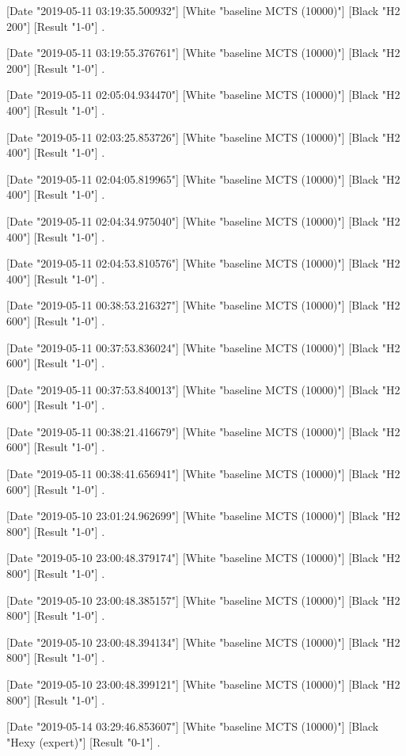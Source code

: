 {[Date "2019-05-11 03:19:35.500932"]
[White "baseline MCTS (10000)"]
[Black "H2 200"]
[Result "1-0"]
.

[Date "2019-05-11 03:19:55.376761"]
[White "baseline MCTS (10000)"]
[Black "H2 200"]
[Result "1-0"]
.

[Date "2019-05-11 02:05:04.934470"]
[White "baseline MCTS (10000)"]
[Black "H2 400"]
[Result "1-0"]
.

[Date "2019-05-11 02:03:25.853726"]
[White "baseline MCTS (10000)"]
[Black "H2 400"]
[Result "1-0"]
.

[Date "2019-05-11 02:04:05.819965"]
[White "baseline MCTS (10000)"]
[Black "H2 400"]
[Result "1-0"]
.

[Date "2019-05-11 02:04:34.975040"]
[White "baseline MCTS (10000)"]
[Black "H2 400"]
[Result "1-0"]
.

[Date "2019-05-11 02:04:53.810576"]
[White "baseline MCTS (10000)"]
[Black "H2 400"]
[Result "1-0"]
.

[Date "2019-05-11 00:38:53.216327"]
[White "baseline MCTS (10000)"]
[Black "H2 600"]
[Result "1-0"]
.

[Date "2019-05-11 00:37:53.836024"]
[White "baseline MCTS (10000)"]
[Black "H2 600"]
[Result "1-0"]
.

[Date "2019-05-11 00:37:53.840013"]
[White "baseline MCTS (10000)"]
[Black "H2 600"]
[Result "1-0"]
.

[Date "2019-05-11 00:38:21.416679"]
[White "baseline MCTS (10000)"]
[Black "H2 600"]
[Result "1-0"]
.

[Date "2019-05-11 00:38:41.656941"]
[White "baseline MCTS (10000)"]
[Black "H2 600"]
[Result "1-0"]
.

[Date "2019-05-10 23:01:24.962699"]
[White "baseline MCTS (10000)"]
[Black "H2 800"]
[Result "1-0"]
.

[Date "2019-05-10 23:00:48.379174"]
[White "baseline MCTS (10000)"]
[Black "H2 800"]
[Result "1-0"]
.

[Date "2019-05-10 23:00:48.385157"]
[White "baseline MCTS (10000)"]
[Black "H2 800"]
[Result "1-0"]
.

[Date "2019-05-10 23:00:48.394134"]
[White "baseline MCTS (10000)"]
[Black "H2 800"]
[Result "1-0"]
.

[Date "2019-05-10 23:00:48.399121"]
[White "baseline MCTS (10000)"]
[Black "H2 800"]
[Result "1-0"]
.

[Date "2019-05-14 03:29:46.853607"]
[White "baseline MCTS (10000)"]
[Black "Hexy (expert)"]
[Result "0-1"]
.
}